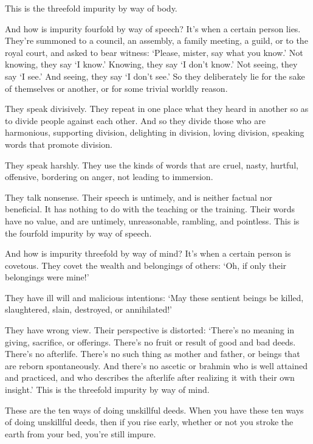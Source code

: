 \documentclass[12pt,openany]{book}%
\begin{document}
This is the threefold impurity by way of body. 

And how is impurity fourfold by way of speech? It’s when a certain person lies. They’re summoned to a council, an assembly, a family meeting, a guild, or to the royal court, and asked to bear witness: ‘Please, mister, say what you know.’ Not knowing, they say ‘I know.’ Knowing, they say ‘I don’t know.’ Not seeing, they say ‘I see.’ And seeing, they say ‘I don’t see.’ So they deliberately lie for the sake of themselves or another, or for some trivial worldly reason. 

They speak divisively. They repeat in one place what they heard in another so as to divide people against each other. And so they divide those who are harmonious, supporting division, delighting in division, loving division, speaking words that promote division. 

They speak harshly. They use the kinds of words that are cruel, nasty, hurtful, offensive, bordering on anger, not leading to immersion. 

They talk nonsense. Their speech is untimely, and is neither factual nor beneficial. It has nothing to do with the teaching or the training. Their words have no value, and are untimely, unreasonable, rambling, and pointless. This is the fourfold impurity by way of speech. 

And how is impurity threefold by way of mind? It’s when a certain person is covetous. They covet the wealth and belongings of others: ‘Oh, if only their belongings were mine!’ 

They have ill will and malicious intentions: ‘May these sentient beings be killed, slaughtered, slain, destroyed, or annihilated!’ 

They have wrong view. Their perspective is distorted: ‘There’s no meaning in giving, sacrifice, or offerings. There’s no fruit or result of good and bad deeds. There’s no afterlife. There’s no such thing as mother and father, or beings that are reborn spontaneously. And there’s no ascetic or brahmin who is well attained and practiced, and who describes the afterlife after realizing it with their own insight.’ This is the threefold impurity by way of mind. 

These are the ten ways of doing unskillful deeds. When you have these ten ways of doing unskillful deeds, then if you rise early, whether or not you stroke the earth from your bed, you’re still impure. 
\end{document}
